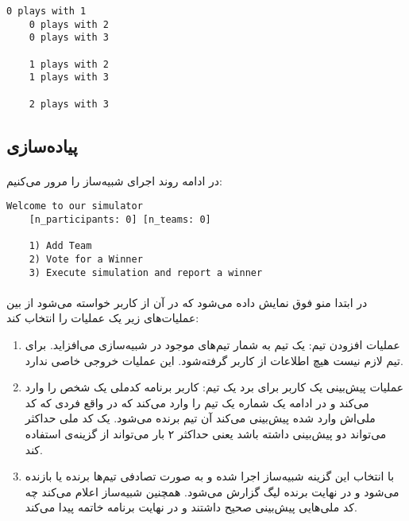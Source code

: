 \documentclass[../main.tex]{subfiles}
\begin{document}
\begin{latin}
\begin{lstlisting}[]
    0 plays with 1
    0 plays with 2
    0 plays with 3

    1 plays with 2
    1 plays with 3

    2 plays with 3
\end{lstlisting}
\end{latin}

\subsection{پیاده‌سازی}

\paragraph{}
در ادامه روند اجرای شبیه‌ساز را مرور می‌کنیم:


\begin{latin}
\begin{lstlisting}[]
    Welcome to our simulator
    [n_participants: 0] [n_teams: 0]

    1) Add Team
    2) Vote for a Winner
    3) Execute simulation and report a winner
\end{lstlisting}
\end{latin}

\paragraph{}
در ابتدا منو فوق نمایش داده می‌شود
که در آن از کاربر خواسته می‌شود از بین عملیات‌های زیر یک عملیات را انتخاب کند:

\begin{enumerate}
    \item عملیات افزودن تیم: یک تیم به شمار تیم‌های موجود در شبیه‌سازی می‌افزاید.
        برای تیم لازم نیست هیچ اطلاعات از کاربر گرفته‌شود. این عملیات خروجی خاصی ندارد.
    \item عملیات پیش‌بینی یک کاربر برای برد یک تیم:
        کاربر برنامه کدملی یک شخص را وارد می‌کند و در ادامه یک شماره یک تیم را وارد می‌کند
        که در واقع فردی که کد ملی‌اش وارد شده پیش‌بینی می‌کند آن تیم برنده می‌شود.
        یک کد ملی حداکثر می‌تواند دو پیش‌بینی داشته باشد
        یعنی حداکثر ۲ بار می‌تواند از گزینه‌ی
        استفاده کند. 
    \item با انتخاب این گزینه شبیه‌ساز اجرا شده و به صورت تصادفی تیم‌ها برنده یا بازنده می‌شود
        و در نهایت برنده لیگ گزارش می‌شود.
        همچنین شبیه‌ساز اعلام می‌کند چه کد ملی‌هایی پیش‌بینی صحیح داشتند و در نهایت برنامه خاتمه پیدا می‌کند.
\end{enumerate}
\end{document}
